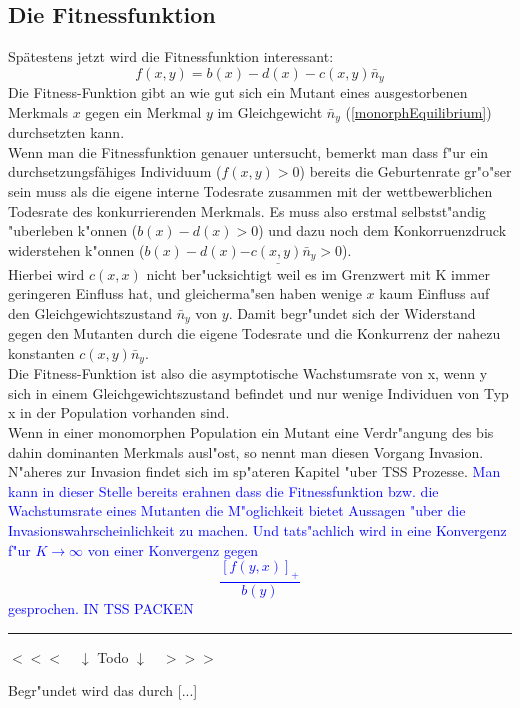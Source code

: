 \documentclass[11pt, a4paper, german]{article}
\theoremstyle{plain}
\begin{document}
	\subsection{Die Fitnessfunktion}
		Spätestens jetzt wird die Fitnessfunktion interessant:
		\[ f(x,y) = b(x) - d(x) - c(x,y)\bar{n}_y \]
		Die Fitness-Funktion gibt an wie gut sich ein Mutant eines ausgestorbenen Merkmals $ x $ gegen ein Merkmal $ y $ im Gleichgewicht $ \bar{n}_y $ (\ref{monorphEquilibrium}) durchsetzten kann. \\
		Wenn man die Fitnessfunktion genauer untersucht, bemerkt man dass f"ur ein durchsetzungsfähiges Individuum ($ f(x,y) > 0 $) bereits die Geburtenrate gr"o"ser sein muss als die eigene interne Todesrate zusammen mit der wettbewerblichen Todesrate des konkurrierenden Merkmals. Es muss also erstmal selbstst"andig "uberleben k"onnen ($ b(x) - d(x) > 0 $) und dazu noch dem Konkorruenzdruck widerstehen k"onnen ($ b(x) - d(x) \underline{- c(x,y)\bar{n}_y} > 0 $).\\
		Hierbei wird $ c(x,x) $ nicht ber"ucksichtigt weil es im Grenzwert mit K immer geringeren Einfluss hat, und gleicherma"sen haben wenige $ x  $ kaum Einfluss auf den Gleichgewichtszustand $ \bar{n}_y $ von $ y $. Damit begr"undet sich der Widerstand gegen den Mutanten durch die eigene Todesrate und die Konkurrenz der nahezu konstanten $ c(x,y)\bar{n}_y $. \\
		Die Fitness-Funktion ist also die asymptotische Wachstumsrate von x, wenn y sich in einem Gleichgewichtszustand befindet und nur wenige Individuen von Typ x in der Population vorhanden sind.\\
		Wenn in einer monomorphen Population ein Mutant eine Verdr"angung des bis dahin dominanten Merkmals ausl"ost, so nennt man diesen Vorgang Invasion. N"aheres zur Invasion findet sich im sp"ateren Kapitel "uber TSS Prozesse.
		\textcolor{blue}{Man kann in dieser Stelle bereits erahnen dass die Fitnessfunktion bzw. die Wachstumsrate eines Mutanten die M"oglichkeit bietet Aussagen "uber die Invasionswahrscheinlichkeit zu machen. Und tats"achlich wird in \cite{Champagnat20061127} eine Konvergenz f"ur $ K \to \infty $ von einer Konvergenz gegen 
		\[ \frac{\left[ f(y,x)\right]_+ }{b(y)} \]
		gesprochen. IN TSS PACKEN} \\
\noindent\rule{\textwidth}{2pt}
\begin{center}
	$ <<< \quad \downarrow $ Todo $ \downarrow \quad >>> $
\end{center}
		Begr"undet wird das durch [...]\\
	
\end{document}
